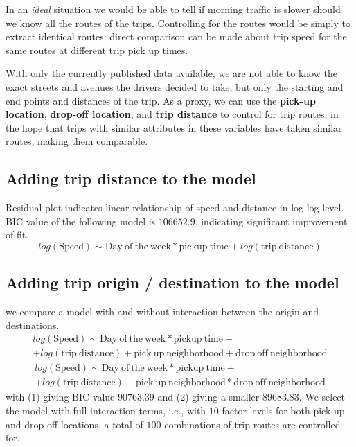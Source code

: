 \documentclass[10pt,a4paper]{article} %
\begin{document}
{    In an \emph{ideal} situation we would be able to tell if morning traffic is slower should we know all the routes of the trips. Controlling for the routes would be simply to extract identical routes: direct comparison can be made about trip speed for the same routes at different trip pick up times. 
    
    With only the currently published data available, we are not able to know the exact streets and avenues the drivers decided to take, but only the starting and end points and distances of the trip. As a proxy, we can use the \textbf{pick-up location}, \textbf{drop-off location}, and \textbf{trip distance} to control for trip routes, in the hope that trips with similar attributes in these variables have taken similar routes, making them comparable.
    
    \subsection{Adding trip distance to the model}
    
    Residual plot indicates linear relationship of speed and distance in log-log level. BIC value of the following model is $106652.9$, indicating significant improvement of fit.
    $$log(\mathrm{Speed})\sim\mathrm{Day\ of\ the\ week}*\mathrm{pickup\ time} + log(\mathrm{trip\ distance})$$
    
    \subsection{Adding trip origin / destination to the model}
    
    we compare a model with and without interaction between the origin and destinations.
    \begin{multline}
        log(\mathrm{Speed})\sim\mathrm{Day\ of\ the\ week}*\mathrm{pickup\ time} +\\ + log(\mathrm{trip\ distance}) + \mathrm{pick\ up\ neighborhood} + \mathrm{drop\ off\ neighborhood}
    \end{multline}
    \begin{multline}
        log(\mathrm{Speed})\sim\mathrm{Day\ of\ the\ week}*\mathrm{pickup\ time} +\\ + log(\mathrm{trip\ distance}) + \mathrm{pick\ up\ neighborhood} * \mathrm{drop\ off\ neighborhood}
    \end{multline}
    with (1) giving BIC value $90763.39$ and (2) giving a smaller $89683.83$. We select the model with full interaction terms, i.e., with $10$ factor levels for both pick up and drop off locations, a total of $100$ combinations of trip routes are controlled for.
    
}
\end{document}
